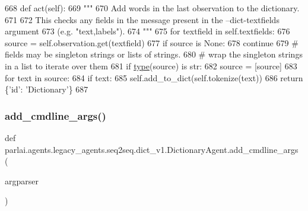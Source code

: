 \begin{DoxyCode}
668     \textcolor{keyword}{def }act(self):
669         \textcolor{stringliteral}{"""}
670 \textcolor{stringliteral}{        Add words in the last observation to the dictionary.}
671 \textcolor{stringliteral}{}
672 \textcolor{stringliteral}{        This checks any fields in the message present in the --dict-textfields argument}
673 \textcolor{stringliteral}{        (e.g. "text,labels").}
674 \textcolor{stringliteral}{        """}
675         \textcolor{keywordflow}{for} textfield \textcolor{keywordflow}{in} self.textfields:
676             source = self.observation.get(textfield)
677             \textcolor{keywordflow}{if} source \textcolor{keywordflow}{is} \textcolor{keywordtype}{None}:
678                 \textcolor{keywordflow}{continue}
679             \textcolor{comment}{# fields may be singleton strings or lists of strings.}
680             \textcolor{comment}{# wrap the singleton strings in a list to iterate over them}
681             \textcolor{keywordflow}{if} \hyperlink{namespaceparlai_1_1agents_1_1tfidf__retriever_1_1build__tfidf_ad5dfae268e23f506da084a9efb72f619}{type}(source) \textcolor{keywordflow}{is} str:
682                 source = [source]
683             \textcolor{keywordflow}{for} text \textcolor{keywordflow}{in} source:
684                 \textcolor{keywordflow}{if} text:
685                     self.add\_to\_dict(self.tokenize(text))
686         \textcolor{keywordflow}{return} \{\textcolor{stringliteral}{'id'}: \textcolor{stringliteral}{'Dictionary'}\}
687 
\end{DoxyCode}
\mbox{\label{classparlai_1_1agents_1_1legacy__agents_1_1seq2seq_1_1dict__v1_1_1DictionaryAgent_af61a97dffe00fd1289b0389a6916aa35}} 
\subsubsection{\texorpdfstring{add\+\_\+cmdline\+\_\+args()}{add\_cmdline\_args()}}
{\footnotesize\ttfamily def parlai.\+agents.\+legacy\+\_\+agents.\+seq2seq.\+dict\+\_\+v1.\+Dictionary\+Agent.\+add\+\_\+cmdline\+\_\+args (\begin{DoxyParamCaption}\item[{}]{argparser }\end{DoxyParamCaption})\hspace{0.3cm}{\ttfamily [static]}}

